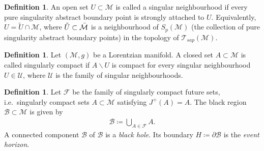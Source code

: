 \documentclass[pdflatex,sn-mathphys-num]{sn-jnl}
\newtheorem{prop}[theorem]{Proposition}
\theoremstyle{definition}
\newtheorem{defn}[theorem]{Definition}
\begin{document}
\begin{defn}\label{defn:singular neighourhood}
    An open set $U \subset \mathcal{M}$ is called a singular neighbourhood if every pure singularity abstract boundary point is strongly attached to $U$. Equivalently, $U = \tilde{U} \cap \mathcal{M}$, where $\tilde{U} \subset \Bar{\mathcal{M}}$ is a neighbourhood of $S_p(\mathcal{M})$ (the collection of pure singularity abstract boundary points) in the topology of $\mathcal{T}_{sap}(\mathcal{M})$. 
\end{defn}
\begin{defn}\label{defn:singularly compact}
    Let $(\mathcal{M},g)$ be a Lorentzian manifold. A closed set $A \subset \mathcal{M}$ is called singularly compact if $A \backslash U$ is compact for every singular neighbourhood $U \in \mathcal{U}$, where $\mathcal{U}$ is the family of singular neighbourhoods.
\end{defn}
\begin{defn}\label{blackhole from singularity}
    Let $\mathcal{F}$ be the family of singularly compact future sets, i.e.\ singularly compact sets $A \subset \mathcal{M}$ satisfying $J^+(A) = A$. The black region $\mathscr{B} \subset \mathcal{M}$ is given by
    \begin{align}
        \mathscr{B} \coloneq \bigcup_{A \in \mathscr{F}}A.
    \end{align}
    A connected component $\mathcal{B}$ of $\mathscr{B}$ is a \textit{black hole}. Its boundary $H  \coloneq \partial \mathcal{B}$ is the \textit{event horizon}.
\end{defn}
\end{document}
